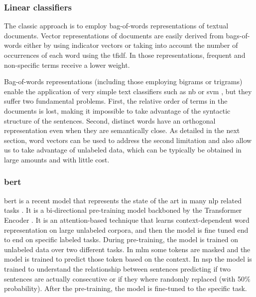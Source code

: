 \subsubsection{Linear classifiers}
The classic approach is to employ bag-of-words
representations of textual documents.
Vector representations of documents are easily
derived from bags-of-words either by using indicator vectors or taking
into account the number of occurrences of each word using the
\ac{tfidf}\cite{manning_introduction_2008}. In those representations,
frequent and non-specific terms receive a lower weight.

Bag-of-words representations (including those employing bigrams or
trigrams) enable the application of very simple text classifiers such
as \ac{nb} or \ac{svm} \cite{cortes-support-1995}, but they
suffer two fundamental problems. First, the relative order of terms in
the documents is lost, making it impossible to take advantage of the
syntactic structure of the sentences. Second, distinct words have an
orthogonal representation even when they are semantically
close. As detailed in the next section, word vectors can be used to
address the second limitation and also allow us to take advantage of
unlabeled data, which can be typically be obtained in large amounts
and with little cost.

\subsubsection{\acs{bert}}
\ac{bert} \cite{devlin2018bert} is a recent model that represents the
state of the art in many \ac{nlp} related tasks
\cite{chatterjee2019semeval,hu2019introductory,lee2019biobert,tshitoyan2019unsupervised}.
It is a
bi-directional pre-training model backboned by the Transformer Encoder
\cite{vaswani2017attention}. It is an attention-based technique that
learns context-dependent word representation on large unlabeled
corpora, and then the model is fine tuned end to end on specific labeled
tasks. During pre-training, the model is trained
on unlabeled data over two different tasks. In \ac{mlm} some tokens
are masked and the model is trained to predict those token based on
the context. In \ac{nsp} the model is trained to understand the
relationship between sentences predicting if two sentences are actually
consecutive or if they where randomly replaced (with 50\%
probability). After the pre-training, the model is fine-tuned to the
specific task.


